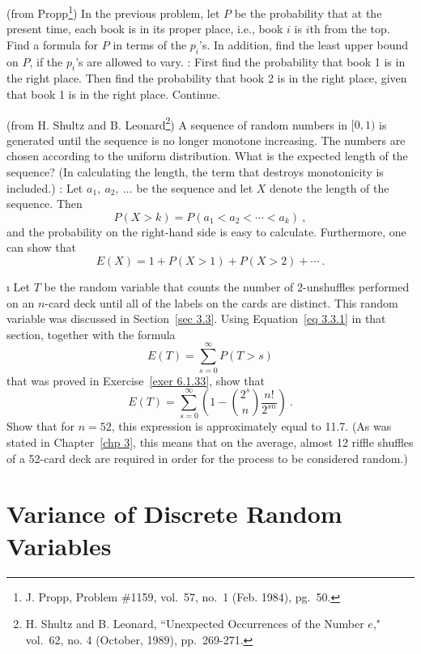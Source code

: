 \begin{LJSItem}
\istar\label{exer 6.1.40}
(from Propp\footnote{J. Propp, Problem \#1159,  vol.~57, no.\ 1
(Feb. 1984), pg.~50.}) In the previous problem, let $P$ be the probability
that at the present time, each book is in its proper place, i.e., book $i$ is $i$th from the
top.  Find a formula for $P$ in terms of the $p_i$'s.  In addition, find the least upper
bound on $P$, if the $p_i$'s are allowed to vary.  :   First find the probability
that book 1 is in the right place.  Then find the probability that book 2 is in the right
place, given that book 1 is in the right place.  Continue.

\istar\label{exer 6.1.41}
(from H. Shultz and B. Leonard\footnote{H. Shultz and B. Leonard, ``Unexpected Occurrences of the
Number $e$,"
 vol.~62, no. 4 (October, 1989), pp.~269-271.})  A sequence of random numbers in $[0, 1)$ is generated until the sequence is
no longer monotone increasing.  The numbers are chosen according to the uniform distribution.  What
is the expected length of the sequence?  (In calculating the length, the term that destroys
monotonicity is included.) :  Let $a_1,\ a_2,\ \ldots$ be the sequence and let $X$ denote
the length of the sequence.  Then
$$P(X > k) = P(a_1 < a_2 < \cdots < a_k)\ ,$$
and the probability on the right-hand side is easy to calculate.  Furthermore, one can show that
$$E(X) = 1 + P(X > 1) + P(X > 2) + \cdots\ .$$

\i\label{exer 6.1.42}
Let $T$ be the random variable that counts the number of 2-unshuffles performed on an $n$-card deck
until all of the labels on the cards are distinct.  This random variable was discussed in
Section~\ref{sec 3.3}.  Using Equation~\ref{eq 3.3.1} in that section, together with the formula
$$
E(T) = \sum_{s = 0}^\infty P(T > s)
$$
that was proved in Exercise~\ref{exer 6.1.33}, show that
$$
E(T) = \sum_{s = 0}^\infty \left(1 - {{2^s}\choose n}\frac {n!}{2^{sn}}\right)\ .
$$
Show that for $n = 52$, this expression is approximately equal to 11.7.  (As was stated in
Chapter~\ref{chp 3}, this means that on the average, almost 12 riffle shuffles of a 52-card 
deck are required in order for the process to be considered random.)


\end{LJSItem}

\section{Variance of Discrete Random Variables}\label{sec 6.2}

